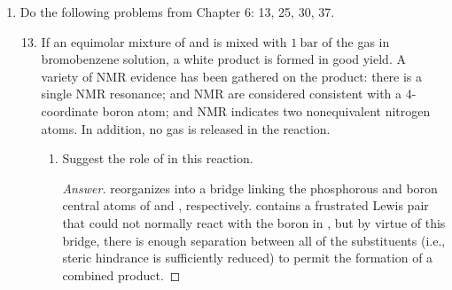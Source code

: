 \documentclass[../psets.tex]{subfiles}
\begin{document}
\begin{enumerate}[label={\Roman*)}]
\begin{enumerate}[label={\alph*.}]
\begin{proof}[Answer]
            \begin{align*}
                \frac{2k_FNa}{\pi} &= \frac{N}{4}\\
                \frac{k_Fa}{\pi} &= \frac{1}{8}\\
                k_F &= \frac{\pi}{8a}\\
                \Aboxed{k_F &= \SI{1.96e9}{\per\meter}}
            \end{align*}
            As to the other part of the question, refer to Figure \ref{fig:s-orbitalsb} once again. It tells us that the height of the Fermi energy above the bottom of the band is given by
            \begin{align*}
                h &= E(k_F)-E(0)\\
                &= \alpha+2\beta\cos\left( \frac{\pi}{8a}\cdot a \right)-(\alpha+2\beta\cos(0\cdot a))\\
                &= 2\beta\left( \cos\left( \frac{\pi}{8} \right)-1 \right)\\
                \Aboxed{h &= \SI{0.304}{eV}}
            \end{align*}
        \end{proof}
    \end{enumerate}
    \newpage
    \item Do the following problems from Chapter 6: 13, 25, 30, 37.
    \begin{enumerate}[label={\textbf{6.\arabic*}}]
        \setcounter{enumii}{12}
        \item If an equimolar mixture of  and  is mixed with $\SI{1}{\bar}$ of the gas  in bromobenzene solution, a white product is formed in good yield. A variety of NMR evidence has been gathered on the product: there is a single  NMR resonance;  and  NMR are considered consistent with a 4-coordinate boron atom; and  NMR indicates two nonequivalent nitrogen atoms. In addition, no gas is released in the reaction.
        \begin{enumerate}[label={\textbf{\alph*.}}]
            \item Suggest the role of  in this reaction.
            \begin{proof}[Answer]
                 reorganizes into a bridge linking the phosphorous and boron central atoms of  and , respectively.  contains a frustrated Lewis pair that could not normally react with the boron in , but by virtue of this bridge, there is enough separation between all of the substituents (i.e., steric hindrance is sufficiently reduced) to permit the formation of a combined product.

\end{proof}
\end{enumerate}
\end{enumerate}
\end{enumerate}
\end{document}
